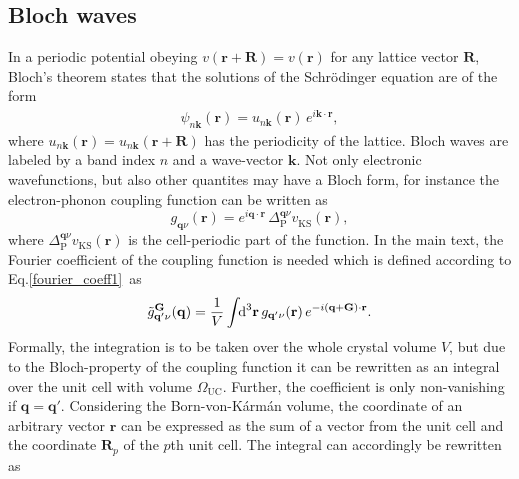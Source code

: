 \subsection{Bloch waves}
In a periodic potential obeying $v(\mathbf{r+R})=v(\mathbf{r})$ for any lattice vector $\mathbf{R}$, Bloch's theorem states that the solutions of the Schr\"odinger equation are of the form 
%
\begin{align}\label{bloch_int}
    \psi_{n\mathbf{k}}(\mathbf{r}) =  u_{n\mathbf{k}}(\mathbf{r})\,e^{i\mathbf{k\cdot r}},
\end{align}
%
where $u_{n\mathbf{k}}(\mathbf{r})=u_{n\mathbf{k}}(\mathbf{r+R})$ has the periodicity of the lattice. Bloch waves are labeled by a band index $n$ and a wave-vector $\mathbf{k}$. Not only electronic wavefunctions, but also other quantites may have a Bloch form, for instance the electron-phonon coupling function can be written as
%
\begin{equation}\label{blochcoupl2}
        g_{\mathbf{q}\nu}(\mathbf{r}) = e^{i\mathbf{q\cdot r}}\,\Delta_\text{P}^{\!\mathbf{q}\nu}v      ^{\phantom{I}}_\text{KS}(\mathbf{r}),
\end{equation}
%
where $\Delta_\text{P}^{\!\mathbf{q}\nu}v      ^{\phantom{I}}_\text{KS}(\mathbf{r})$ is the cell-periodic part of the function. In the main text, the Fourier coefficient of the coupling function is needed which is defined according to Eq.\;\eqref{fourier_coeff1}~as
%
\begin{align}\label{coupling_fourier2}
     \Tilde{g}_{\mathbf{q'}\nu}^{\mathbf{G}}(\mathbf{q}) = \frac{1}{V} \int \text{\!\!d}^3\mathbf{r}\, g_{\mathbf{q'}\nu}(\mathbf{r})\,e^{-i(\mathbf{q}+\mathbf{G})\cdot\mathbf{r}}.
\end{align}
%
Formally, the integration is to be taken over the whole crystal volume $V$, but due to the Bloch-property of the coupling function it can be rewritten as an integral over the unit cell with volume $\Omega^{\phantom{I}}_\text{UC}$. Further, the coefficient is only non-vanishing if $\mathbf{q=q'}$. Considering the Born-von-K\'{a}rm\'{a}n volume, the coordinate of an arbitrary vector $\mathbf{r}$ can \newpage be expressed as the sum of a vector from the unit cell and the coordinate $\mathbf{R}_p$ of the $p$th unit cell. The integral can accordingly be rewritten as
%
